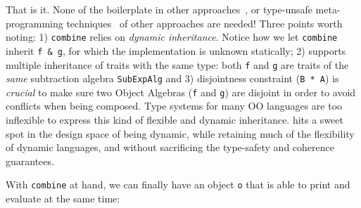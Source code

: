 That is it. None of the boilerplate in other approaches~\cite{oliveira2012extensibility}, or type-unsafe
meta-programming techniques~\cite{oliveira2013feature,rendel14attributes} of other approaches are needed! Three points
worth noting: 1) \lstinline{combine} relies on \textit{dynamic inheritance}.
Notice how we let \lstinline{combine} inherit \lstinline{f & g}, for which the
implementation is unknown statically; 2) \name supports multiple inheritance of
traits with the same type: both \lstinline{f} and \lstinline{g} are traits of
the \emph{same} subtraction algebra \lstinline{SubExpAlg} and 3) disjointness
constraint (\lstinline{B * A}) is \textit{crucial} to make sure two Object
Algebras (\lstinline{f} and \lstinline{g}) are disjoint in order to avoid
conflicts when being composed. Type systems for many OO languages are too
inflexible to express this kind of flexible and dynamic inheritance. \name hits
a sweet spot in the design space of being dynamic, while retaining much
of the flexibility of dynamic languages, and without sacrificing the type-safety and
coherence guarantees.

With \lstinline{combine} at hand, we can finally have an object \lstinline{o}
that is able to print and evaluate at the same time:



\begin{comment}
which is of type
\lstinline{Exp}, to \lstinline{sub}, which expects a value of type
\lstinline{ExtExp}. This works precisely because \lstinline{Exp} is a
\textit{subtype} of \lstinline{ExtExp}. An acute reader by now may find an issue
about code reuse, i.e., we cannot reuse constructors! For example, the following
is rejected:
Instead, \lstinline{e3} should be written as follow:
Although, admittedly, creating expressions like this is slightly more
cumbersome.
\end{comment}



